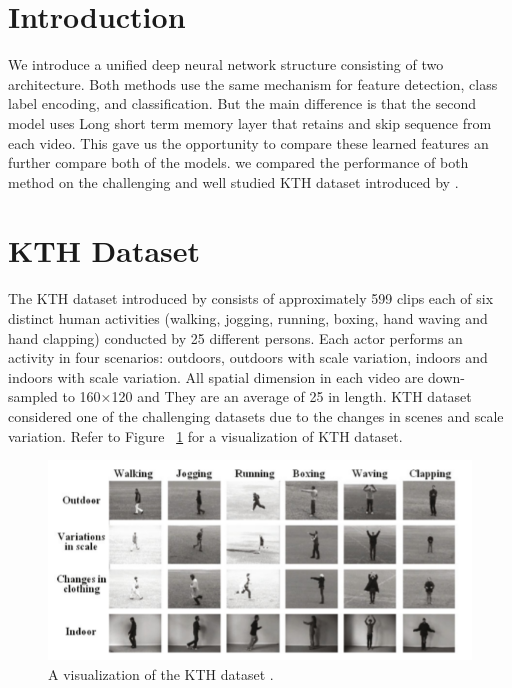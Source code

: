 \section{Introduction}
We introduce a unified deep neural network structure consisting of two architecture. Both methods use the same mechanism for feature detection, class label encoding, and classification. But the main difference is that the second model uses Long short term memory layer that retains and skip sequence from each video. This gave us the opportunity to compare these learned features an further compare both of the models. we compared the performance of both method on the challenging and well studied KTH dataset introduced by \cite{schuldt2004recognizing}.

\section{KTH Dataset}
The KTH dataset introduced by \cite{laptev2004recognizing} consists of approximately 599 clips each of six distinct human activities (walking, jogging, running, boxing, hand waving and hand clapping) conducted by 25 different persons. Each actor performs an activity in four scenarios: outdoors, outdoors with scale variation, indoors and indoors with scale variation. All spatial dimension in each video are down-sampled to 160×120 and They are an average of 25 in length. KTH dataset considered
one of the challenging datasets due to the changes in scenes and scale variation. Refer to Figure ~\ref{fig:datasetset1KTH} for a visualization of KTH dataset. 

\begin{figure}[th]
\centering
\includegraphics[width=0.85\columnwidth]{Chapters/photos/dt1.png}
\decoRule
\caption[A visualization of the KTH dataset \cite{schuldt2004recognizing}.]{A visualization of the KTH dataset \cite{schuldt2004recognizing}.}
\label{fig:datasetset1KTH}
\end{figure}\\

